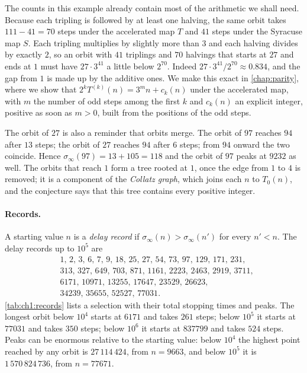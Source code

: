 The counts in this example already contain most of the arithmetic we shall
need. Because each tripling is followed by at least one halving, the same orbit
takes $111-41=70$ steps under the accelerated map $T$ and $41$ steps under the
Syracuse map $S$. Each tripling multiplies by slightly more than $3$ and each
halving divides by exactly $2$, so an orbit with $41$ triplings and $70$
halvings that starts at $27$ and ends at $1$ must have $27\cdot3^{41}$ a little
below $2^{70}$. Indeed $27\cdot3^{41}/2^{70}\approx0.834$, and the gap from
$1$ is made up by the additive ones. We make this exact in
\cref{chap:parity}, where we show that $2^k T^{(k)}(n)=3^m n+c_k(n)$ under
the accelerated map, with $m$ the number of odd steps among the first $k$ and
$c_k(n)$ an explicit integer, positive as soon as $m>0$, built from the
positions of the odd steps.

The orbit of $27$ is also a reminder that orbits merge. The orbit of $97$
reaches $94$ after $13$ steps; the orbit of $27$ reaches $94$ after $6$ steps;
from $94$ onward the two coincide. Hence $\sigma_\infty(97)=13+105=118$ and
the orbit of $97$ peaks at $9232$ as well.
The orbits that reach $1$ form a tree rooted at $1$, once the edge from $1$ to $4$ is removed; it is a component of the \emph{Collatz graph}, which joins each $n$ to $T_0(n)$, and the conjecture says that this tree contains every positive integer.

\paragraph{Records.} A starting value $n$ is a \emph{delay record} if
$\sigma_\infty(n)>\sigma_\infty(n')$ for every $n'<n$. The delay records up to
$10^5$ are
\[
\begin{aligned}
&1,\,2,\,3,\,6,\,7,\,9,\,18,\,25,\,27,\,54,\,73,\,97,\,129,\,171,\,231,\\
&313,\,327,\,649,\,703,\,871,\,1161,\,2223,\,2463,\,2919,\,3711,\\
&6171,\,10971,\,13255,\,17647,\,23529,\,26623,\\
&34239,\,35655,\,52527,\,77031.
\end{aligned}
\]
\cref{tab:ch1:records} lists a selection with their total stopping times and
peaks. The longest orbit below $10^4$ starts at $6171$ and takes $261$ steps;
below $10^5$ it starts at $77031$ and takes $350$ steps; below $10^6$ it starts
at $837799$ and takes $524$ steps. Peaks can be enormous relative to the
starting value: below $10^4$ the highest point reached by any orbit is
$27\,114\,424$, from $n=9663$, and below $10^5$ it is $1\,570\,824\,736$, from
$n=77671$.

